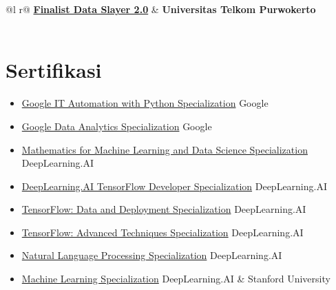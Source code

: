 \documentclass[a4paper,12pt]{article}
\begin{document}
\begin{tabularx}{\linewidth}{ @{}l r@{} }
\textbf{\href{https://drive.google.com/file/d/1C0Lqpp6gYZGfwgYtDjUa75PJxaKPobHK/view?usp=drive_link}{Finalist Data Slayer 2.0}} & \hfill \textbf{Universitas Telkom Purwokerto} \\[3.75pt]
  \\
\end{tabularx}

\hypersetup{linkcolor=blue, urlcolor=blue}

\section{Sertifikasi}
\hypersetup{hidelinks}
\begin{itemize}[nosep, leftmargin=1em, itemsep=3pt, label=--]
  \item \href{https://www.coursera.org/account/accomplishments/specialization/XWCXBMCME5CP}{Google IT Automation with Python Specialization} \hfill Google
  \item \href{https://www.coursera.org/account/accomplishments/specialization/ARJMR4LS8LEX}{Google Data Analytics Specialization} \hfill Google
  \item \href{https://www.coursera.org/account/accomplishments/specialization/V5EDYT656QMY}{Mathematics for Machine Learning and Data Science Specialization} \hfill DeepLearning.AI
  \item \href{https://www.coursera.org/account/accomplishments/specialization/VBCR7M7P5TKS}{DeepLearning.AI TensorFlow Developer Specialization} \hfill DeepLearning.AI
  \item \href{https://www.coursera.org/account/accomplishments/specialization/U84SJDPELJNN}{TensorFlow: Data and Deployment Specialization} \hfill DeepLearning.AI
  \item \href{https://www.coursera.org/account/accomplishments/specialization/ZPBD6NA8587G}{TensorFlow: Advanced Techniques Specialization} \hfill DeepLearning.AI
  \item \href{https://www.coursera.org/account/accomplishments/specialization/CGYD8LFTMX5Y}{Natural Language Processing Specialization} \hfill DeepLearning.AI
  \item \href{https://www.coursera.org/account/accomplishments/specialization/FQ5Y5AMR732R}{Machine Learning Specialization} \hfill DeepLearning.AI \& Stanford University
\end{itemize}
\hypersetup{linkcolor=blue, urlcolor=blue}
\end{document}
